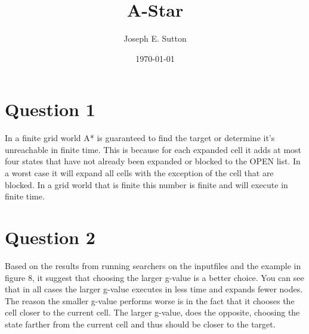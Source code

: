 \documentclass[12pt]{article}
\title{\vspace{-35pt}
         A-Star}
\author{
	Joseph E. Sutton\\
	}
\date{\today}
\begin{document}
\maketitle
\vspace{-45pt}

\def\thesection{}
\section{\hspace{-0.4in} Question 1}
\vspace{-0.1in}
In a finite grid world A* is guaranteed to find the target or determine it's unreachable in finite time. This is because for each expanded cell it adds at most four states that have not already been expanded or blocked to the OPEN list. In a worst case it will expand all cells with the exception of the cell that are blocked. In a grid world that is finite this number is finite and will execute in finite time.

\section{\hspace{-0.4in} Question 2}
\vspace{-0.1in}
Based on the results from running searchers on the inputfiles and the example in figure 8, it suggest that choosing the larger g-value is a better choice. You can see that in all cases the larger g-value executes in less time and expands fewer nodes.  The reason the smaller g-value performs worse is in the fact that it chooses the cell closer to the current cell. The larger g-value, does the opposite, choosing the state farther from the current cell and thus should be closer to the target.
\end{document}
